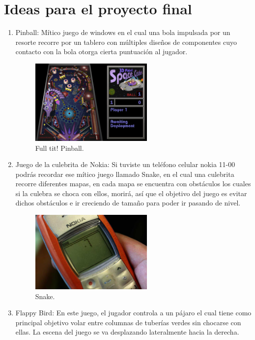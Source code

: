 \documentclass{article}
\begin{document}
\section{Ideas para el proyecto final} \label{contenido}
\begin{enumerate}
  \item {Pinball:} Mítico juego de windows en el cual una bola impulsada por un resorte recorre por un tablero con múltiples diseños de componentes cuyo contacto con la bola otorga cierta puntuación al jugador.
  \begin{figure}[h]
  \includegraphics[width=6cm]{pinball.png}
  \centering
  \caption{Full tit! Pinball.\cite{pinball}}
  \label{fig:pinball}
  \end{figure}
  \item {Juego de  la culebrita de Nokia:} Si tuviste un teléfono celular nokia 11-00 podrás recordar ese mítico juego llamado Snake, en el cual una culebrita recorre diferentes mapas, en cada mapa se encuentra con obstáculos los cuales si la culebra se choca con ellos, morirá, así que el objetivo del juego es evitar dichos obstáculos e ir creciendo de tamaño para poder ir pasando de nivel.
  \begin{figure}[h]
  \includegraphics[width=6cm]{snake.jpg}
  \centering
  \caption{Snake.\cite{snake}}
  \label{fig:snake}
  \end{figure}
  \item {Flappy Bird: }En este juego, el jugador controla a un pájaro el cual tiene como principal objetivo volar entre columnas de tuberías verdes sin chocarse con ellas. La escena del juego se va desplazando lateralmente hacia la derecha.
  \begin{figure}[h]

\end{figure}
\end{enumerate}
\end{document}

